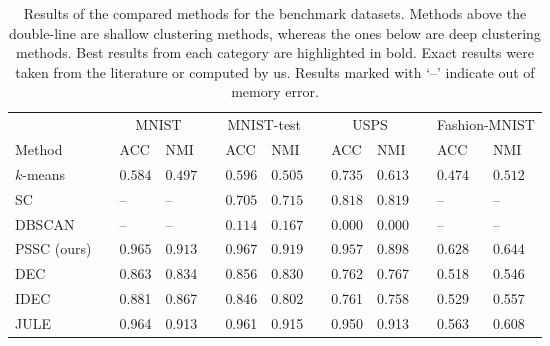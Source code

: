 \documentclass[11pt]{article}
\theoremstyle{definition}
\begin{document}
\begin{table*}[t]
	\centering
	\caption{Results of the compared methods for the benchmark datasets. Methods above the double-line are shallow clustering methods, whereas the ones below are deep clustering methods. Best results from each category are highlighted in bold. Exact results were taken from the literature or computed by us. Results marked with `--' indicate out of memory error.}
	\label{table:clustering evaluation}
	\scriptsize
	\begin{adjustbox}{width=0.99\textwidth}
		\begin{tabular}{lr|llrllrllrll}
			\hline
			&&  \multicolumn{2}{c}{MNIST} && \multicolumn{2}{c}{MNIST-test} && \multicolumn{2}{c}{USPS} && \multicolumn{2}{c}{Fashion-MNIST} \\
			
			Method && ACC & NMI && ACC & NMI  && ACC & NMI  && ACC & NMI \\
			
			\hline
			
			$k$-means~\cite{Macqueen_KMeansClustering_1967}
			&& $0.584 $  & $0.497 $ && $0.596$ &  $0.505$
			&& $0.735 $ &  $0.613 $ && $0.474$ &  $0.512$ \\
			
			SC~\cite{Ng_SpectralClustering_2002}
			&& -- & -- && $0.705 $ & $0.715 $ 
			&& $0.818 $ & $0.819  $ && -- & -- \\
			
			DBSCAN~\cite{Ester_DBSCANDensityBasedClustering_1996}
			&& -- & -- && $0.114 $ & $0.167 $ 
			&& $0.000 $ & $0.000 $ && -- & -- \\
			
			PSSC (ours) && $\mathbf{0.965} $ & $\mathbf{0.913}$ && $\mathbf{0.967}$ & $\mathbf{0.919}$
			&& $\mathbf{0.957}$ & $\mathbf{0.898}$ && $\mathbf{0.628}$ & $\mathbf{0.644}$ \\
			
			\hline
			\hline
			
			DEC~\cite{Xie_UnsupervisedDeepEmbeddingClustering_2016}
			&& 0.863 & 0.834 && 0.856 & 0.830 
			&& 0.762 & 0.767 && 0.518 & 0.546 \\
			
			IDEC~\cite{Guo_ImprovedDeepEmbeddedClustering_2017}
			&& 0.881& 0.867&& 0.846& 0.802
			&& 0.761& 0.758&& 0.529& 0.557\\
			
			JULE~\cite{Yang_JointUnsupervisedLearningImageClusters_2016joint}
			&& 0.964& 0.913&& 0.961& 0.915
			&& 0.950& 0.913&& 0.563& 0.608\\
			

\end{tabular}
\end{adjustbox}
\end{table*}
\end{document}
